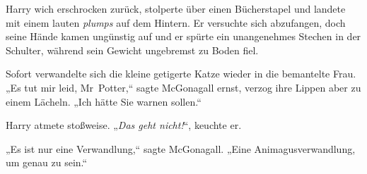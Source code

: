 Harry wich erschrocken zurück, stolperte über einen Bücherstapel und landete mit einem lauten \emph{plumps} auf dem Hintern. Er versuchte sich abzufangen, doch seine Hände kamen ungünstig auf und er spürte ein unangenehmes Stechen in der Schulter, während sein Gewicht ungebremst zu Boden fiel.

Sofort verwandelte sich die kleine getigerte Katze wieder in die bemantelte Frau. „Es tut mir leid, Mr~Potter,“ sagte McGonagall ernst, verzog ihre Lippen aber zu einem Lächeln. „Ich hätte Sie warnen sollen.“

Harry atmete stoßweise. „\emph{Das geht nicht!}“, keuchte er.

„Es ist nur eine Verwandlung,“ sagte McGonagall. „Eine Animagusverwandlung, um genau zu sein.“

